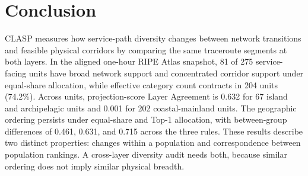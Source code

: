 \section{Conclusion}
\label{sec:conclusion}

CLASP measures how service-path diversity changes between network
transitions and feasible physical corridors by comparing the same
traceroute segments at both layers. In the aligned one-hour RIPE Atlas
snapshot, 81 of 275 service-facing units have broad network support and
concentrated corridor support under equal-share allocation, while effective
category count contracts in 204 units (74.2\%). Across units, projection-score
Layer Agreement is 0.632 for 67 island and archipelagic units and 0.001 for
202 coastal-mainland units. The geographic ordering persists under
equal-share and Top-1 allocation, with between-group differences of
0.461, 0.631, and 0.715 across the three rules. These results describe two
distinct properties: changes within a population and correspondence
between population rankings. A cross-layer diversity audit needs both,
because similar ordering does not imply similar physical breadth.
